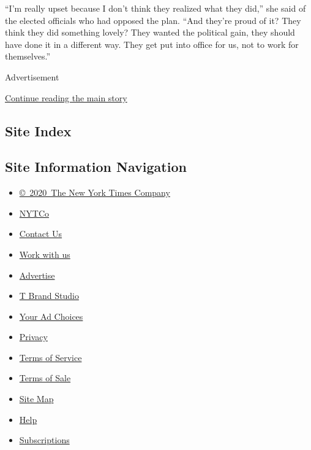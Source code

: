 ``I'm really upset because I don't think they realized what they did,''
she said of the elected officials who had opposed the plan. ``And
they're proud of it? They think they did something lovely? They wanted
the political gain, they should have done it in a different way. They
get put into office for us, not to work for themselves.''

Advertisement

\protect\hyperlink{after-bottom}{Continue reading the main story}

\hypertarget{site-index}{%
\subsection{Site Index}\label{site-index}}

\hypertarget{site-information-navigation}{%
\subsection{Site Information
Navigation}\label{site-information-navigation}}

\begin{itemize}
\tightlist
\item
  \href{https://help.nytimes3xbfgragh.onion/hc/en-us/articles/115014792127-Copyright-notice}{©~2020~The
  New York Times Company}
\end{itemize}

\begin{itemize}
\tightlist
\item
  \href{https://www.nytco.com/}{NYTCo}
\item
  \href{https://help.nytimes3xbfgragh.onion/hc/en-us/articles/115015385887-Contact-Us}{Contact
  Us}
\item
  \href{https://www.nytco.com/careers/}{Work with us}
\item
  \href{https://nytmediakit.com/}{Advertise}
\item
  \href{http://www.tbrandstudio.com/}{T Brand Studio}
\item
  \href{https://www.nytimes3xbfgragh.onion/privacy/cookie-policy\#how-do-i-manage-trackers}{Your
  Ad Choices}
\item
  \href{https://www.nytimes3xbfgragh.onion/privacy}{Privacy}
\item
  \href{https://help.nytimes3xbfgragh.onion/hc/en-us/articles/115014893428-Terms-of-service}{Terms
  of Service}
\item
  \href{https://help.nytimes3xbfgragh.onion/hc/en-us/articles/115014893968-Terms-of-sale}{Terms
  of Sale}
\item
  \href{https://spiderbites.nytimes3xbfgragh.onion}{Site Map}
\item
  \href{https://help.nytimes3xbfgragh.onion/hc/en-us}{Help}
\item
  \href{https://www.nytimes3xbfgragh.onion/subscription?campaignId=37WXW}{Subscriptions}
\end{itemize}
